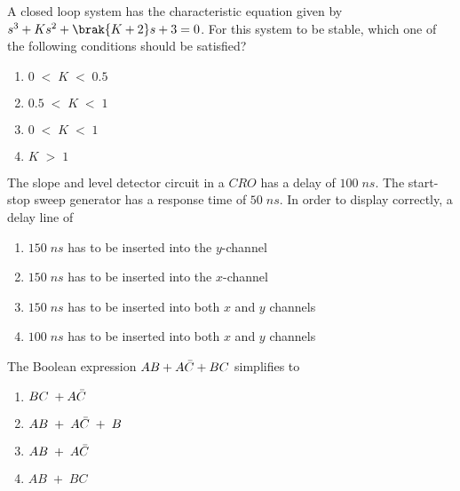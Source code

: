 \item A closed loop system has the characteristic equation given by $s^3+Ks^2+\brak{K+2}s+3=0$. For this system to be stable, which one of the following conditions should be satisfied?
\begin{enumerate}
    \item $0\;<\;K\;<\;0.5$
    \item $0.5\;<\;K\;<\;1$
    \item $0\;<\;K\;<\;1$
    \item $K\;>\;1$
\end{enumerate}
\item The slope and level detector circuit in a $CRO$ has a delay of $100\;ns$. The start-stop sweep generator has a response time of $50\;ns$. In order to display correctly, a delay line of 
\begin{enumerate}
    \item $150\;ns$ has to be inserted into the $y$-channel
    \item $150\;ns$ has to be inserted into the $x$-channel
    \item $150\;ns$ has to be inserted into both $x$ and $y$ channels
    \item $100\;ns$ has to be inserted into both $x$ and $y$ channels
\end{enumerate}
\item The Boolean expression $AB+A\Bar{C}+BC$ simplifies to 
\begin{enumerate}
    \item $BC\;+A\Bar{C}$
    \item $AB\;+\;A\Bar{C}\;+\;B$
    \item $AB\;+\;A\Bar{C}$
    \item $AB\;+\;BC$
\end{enumerate}


